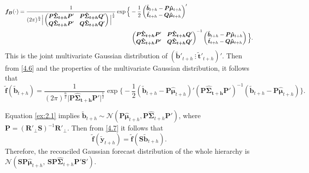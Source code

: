 \documentclass[a4paper, 11pt]{article}
\begin{document}
\begin{align*}
\bm{f_B}(\cdot)&=\frac{1}{(2\pi)^{\frac{n}{2}}\Big|\begin{pmatrix}
  \bm{P}\bm{\hat{\Sigma}_{t+h}}\bm{P}' & \bm{P}\bm{\hat{\Sigma}_{t+h}}\bm{Q}' \\
  \bm{Q}\bm{\hat{\Sigma}_{t+h}}\bm{P}' & \bm{Q}\bm{\hat{\Sigma}_{t+h}}\bm{Q}'
  \end{pmatrix}\Big|^{\frac{1}{2}}}
\exp \Big\{-\frac{1}{2} \begin{pmatrix}\tilde{\bm{b}}_{t+h} - \bm{P}\bm{\hat{\mu}}_{t+h}\\ \tilde{\bm{t}}_{t+h}- \bm{Q}\bm{\hat{\mu}}_{t+h}\end{pmatrix}'\\
&\hspace*{7cm}\begin{pmatrix}
\bm{P}\bm{\hat{\Sigma}_{t+h}}\bm{P}' & \bm{P}\bm{\hat{\Sigma}_{t+h}}\bm{Q}' \\
\bm{Q}\bm{\hat{\Sigma}_{t+h}}\bm{P}' & \bm{Q}\bm{\hat{\Sigma}_{t+h}}\bm{Q}'
\end{pmatrix}^{-1}
\begin{pmatrix}\tilde{\bm{b}}_{t+h} - \bm{P}\bm{\hat{\mu}}_{t+h}\\ \tilde{\bm{t}}_{t+h}- \bm{Q}\bm{\hat{\mu}}_{t+h}\end{pmatrix} \Big\}.
\end{align*}
This is the joint multivariate Gaussian distribution of $(\tilde{\bm{b}}'_{t+h} ~ \vdots~ \tilde{\bm{t}}'_{t+h})'$. Then from \eqref{4.6} and the properties of the multivariate Gaussian distribution, it follows that
\begin{equation}\label{ex:2.1}
\tilde{\bm{f}}(\tilde{\bm{b}}_{t+h})=\frac{1}{(2\pi)^{\frac{n}{2}}\Big|\bm{P}\bm{\hat{\Sigma}_{t+h}}\bm{P}'\Big|^{\frac{1}{2}}}
\exp \Big\{-\frac{1}{2} (\tilde{\bm{b}}_{t+h} - \bm{P}\bm{\hat{\mu}}_{t+h})' (\bm{P}\bm{\hat{\Sigma}_{t+h}}\bm{P}')^{-1}(\tilde{\bm{b}}_{t+h} - \bm{P}\bm{\hat{\mu}}_{t+h}) \Big\}.
\end{equation}

Equation \eqref{ex:2.1} implies $\tilde{\bm{b}}_{t+h} \sim \mathcal{N}(\bm{P}\bm{\hat{\mu}}_{t+h}, \bm{P}\hat{\bm{\Sigma}}_{t+h}\bm{P}')$, where $\bm{P} = (\bm{R}'_\bot \bm{S})^{-1}\bm{R}'_\bot$. Then from \eqref{4.7} it follows that
\begin{equation}\label{eq:gaussianreconciled}
\tilde{\bm{f}}(\tilde{\bm{y}}_{t+h})=\tilde{\bm{f}}(\bm{S}\tilde{\bm{b}}_{t+h}).
\end{equation}
Therefore, the reconciled Gaussian forecast distribution of the whole hierarchy is\\
$\mathcal{N}(\bm{SP}\bm{\hat{\mu}}_{t+h},~ \bm{SP}\hat{\bm{\Sigma}}_{t+h}\bm{P}'\bm{S}')$.
\end{document}
